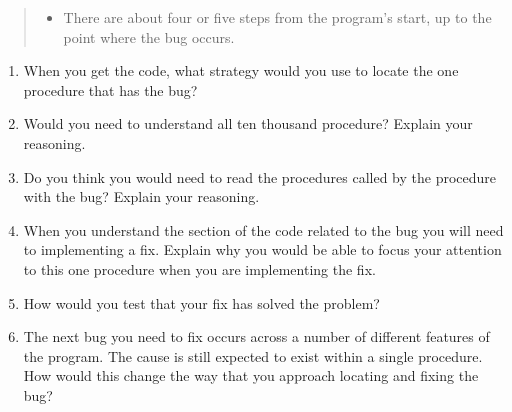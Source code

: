 \begin{enumerate}
\begin{quote}
\begin{itemize}
      \item There are about four or five steps from the program's start, up to the point where the bug occurs.    
    \end{itemize}
  \end{quote}
  \begin{enumerate}
    \item When you get the code, what strategy would you use to locate the one procedure that has the bug?
    \item Would you need to understand all ten thousand procedure? Explain your reasoning.
    \item Do you think you would need to read the procedures called by the procedure with the bug? Explain your reasoning.
    \item When you understand the section of the code related to the bug you will need to implementing a fix. Explain why you would be able to focus your attention to this one procedure when you are implementing the fix.
    \item How would you test that your fix has solved the problem?
    \item The next bug you need to fix occurs across a number of different features of the program. The cause is still expected to exist within a single procedure. How would this change the way that you approach locating and fixing the bug?
  \end{enumerate}
  
\end{enumerate}

